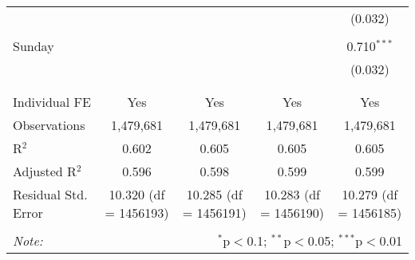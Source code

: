 \documentclass[
]{article}
\begin{document}
\begin{table}[!htbp]
{\begin{tabular}{@{\extracolsep{5pt}}lcccc}
  &  &  &  & (0.032) \\ 
  & & & & \\ 
 Sunday &  &  &  & 0.710$^{***}$ \\ 
  &  &  &  & (0.032) \\ 
  & & & & \\ 
\hline \\[-1.8ex] 
Individual FE & Yes & Yes & Yes & Yes \\ 
Observations & 1,479,681 & 1,479,681 & 1,479,681 & 1,479,681 \\ 
R$^{2}$ & 0.602 & 0.605 & 0.605 & 0.605 \\ 
Adjusted R$^{2}$ & 0.596 & 0.598 & 0.599 & 0.599 \\ 
Residual Std. Error & 10.320 (df = 1456193) & 10.285 (df = 1456191) & 10.283 (df = 1456190) & 10.279 (df = 1456185) \\ 
\hline 
\hline \\[-1.8ex] 
\textit{Note:}  & \multicolumn{4}{r}{$^{*}$p$<$0.1; $^{**}$p$<$0.05; $^{***}$p$<$0.01} \\ 
\end{tabular}
} 
\end{table} 
\newpage
\end{document}
